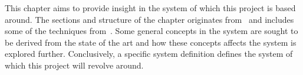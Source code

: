 This chapter aims to provide insight in the system of which this project is based around. The sections and structure of the chapter originates from~\cite{mathiassen2001objektorienteret} and includes some of the techniques from~\cite{benyon2013designing}. Some general concepts in the system are sought to be derived from the state of the art and how these concepts affects the system is explored further. Conclusively, a specific system definition defines the system of which this project will revolve around.